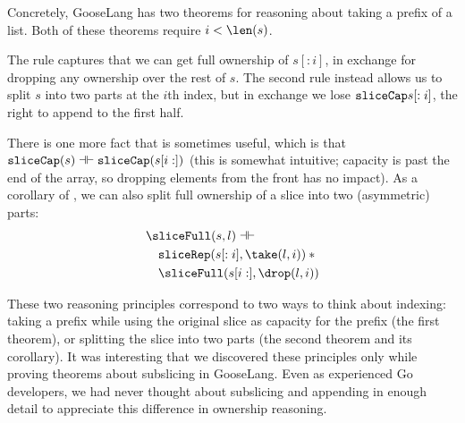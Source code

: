 Concretely, GooseLang has two theorems for reasoning about taking a prefix of a
list. Both of these theorems require $i < \len(s)$.
\begin{mathpar}

\end{mathpar}

The rule  captures that we can get full ownership of
$s[:i]$, in exchange for dropping any ownership over the rest of $s$.
The second rule  instead allows us to split $s$ into two
parts at the $i$th index, but in exchange we lose $\sliceCap{s[:i]}$, the right
to append to the first half.

There is one more fact that is sometimes useful, which is that
$\sliceCap(s) \dashv\vdash \sliceCap(s[i:])$ (this is somewhat intuitive;
capacity is past the end of the array, so dropping elements from the front has
no impact). As a corollary of , we can also split full
ownership of a slice into two (asymmetric) parts:
\begin{align*}
  &\sliceFull(s, l) \dashv\vdash \\
  &\quad \sliceRep(s[:i], \take(l, i)) \sep {} \\
  &\quad \sliceFull(s[i:], \drop(l, i))
\end{align*}

These two reasoning principles correspond to two ways to think about indexing:
taking a prefix while using the original slice as capacity for the prefix (the
first theorem), or splitting the slice into two parts (the second theorem and
its corollary). It was interesting that we discovered these principles only
while proving theorems about subslicing in GooseLang. Even as experienced Go
developers, we had never thought about subslicing and appending in enough detail
to appreciate this difference in ownership reasoning.


